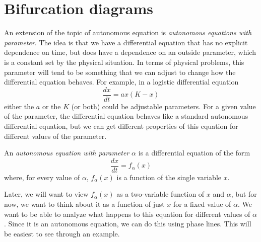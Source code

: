 \section{Bifurcation diagrams}
\label{bifDiag:section}



An extension of the topic of autonomous equation is \emph{autonomous equations with parameter}. The idea is that we have a differential equation that has no explicit dependence on time, but does have a dependence on an outside parameter, which is a constant set by the physical situation. In terms of physical problems, this parameter will tend to be something that we can adjust to change how the differential equation behaves. For example, in a logistic differential equation 
\begin{equation*}
\frac{dx}{dt} = ax(K-x)
\end{equation*}
either the $a$ or the $K$ (or both) could be adjustable parameters. For a given value of the parameter, the differential equation behaves like a standard autonomous differential equation, but we can get different properties of this equation for different values of the parameter. 

\begin{definition}
An \emph{autonomous equation with parameter} $\alpha$ is a differential equation of the form 
\begin{equation*}
\frac{dx}{dt} = f_\alpha(x)
\end{equation*}
where, for every value of $\alpha$, $f_\alpha(x)$ is a function of the single variable $x$. 
\end{definition}

Later, we will want to view $f_\alpha(x)$ as a two-variable function of $x$ and $\alpha$, but for now, we want to think about it as a function of just $x$ for a fixed value of $\alpha$. We want to be able to analyze what happens to this equation for different values of $\alpha$. Since it is an autonomous equation, we can do this using phase lines. This will be easiest to see through an example.

